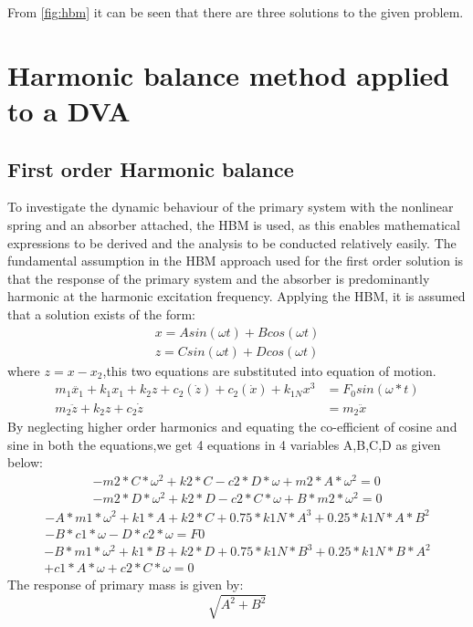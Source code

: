 From \ref{fig:hbm} it can be seen that there are three solutions to the given problem.

\section{Harmonic balance method applied to a DVA}
\subsection{First order Harmonic balance}
To investigate the dynamic behaviour of the primary system with the nonlinear spring and an absorber attached, the HBM is used, as this enables mathematical expressions to be derived and the analysis to be conducted relatively easily. The fundamental assumption in the HBM approach used for the first order solution is that the response of the primary system and the absorber is predominantly harmonic at the harmonic excitation frequency. Applying the HBM, it is assumed that a solution exists of the form:
\begin{align}
x=Asin(\omega t)+Bcos(\omega t)\\
z=Csin(\omega t)+Dcos(\omega t)
\end{align}
where $z=x-x_2$,this two equations are substituted into equation of motion.
\begin{align}
m_1\ddot{x_1}+k_1x_1+k_2z+c_2(\dot{z})+c_2(\dot{x})+k_{1N}x^3&=F_0sin(\omega *t) \\
m_2\ddot{z}+k_2z+c_{2}\dot{z}&=m_2\ddot{x}
\end{align}
By neglecting higher order harmonics and equating the co-efficient of cosine and sine in both the equations,we get 4  equations in 4 variables A,B,C,D as given below:
\begin{align}
-m2*C*\omega^2 + k2*C - c2*D*\omega + m2*A*\omega^2 = 0\\
-m2*D*\omega^2 + k2*D - c2*C*\omega + B*m2*\omega^2 = 0
\end{align}
\begin{multline}
-A*m1*\omega^2 + k1*A + k2*C + 0.75*k1N*A^3 + 0.25*k1N*A*B^2\\- B*c1*\omega - D*c2*\omega = F0
\end{multline}
\begin{multline}
-B*m1*\omega^2 + k1*B + k2*D + 0.75*k1N*B^3 + 0.25*k1N*B*A^2 \\ + c1*A*\omega + c2*C*\omega = 0
\end{multline}
The response of primary mass is given by:$$\sqrt{A^2+B^2}$$

